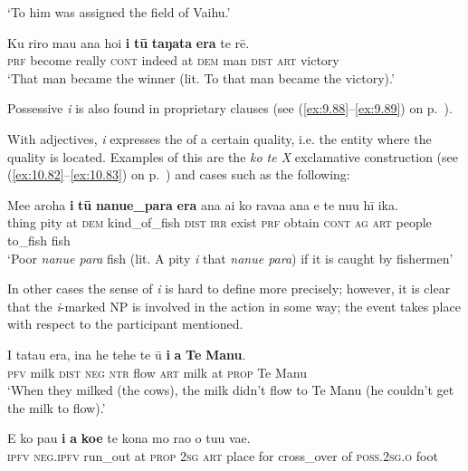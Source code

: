 \glt 
‘To him was assigned the field of Vaihu.’ \textstyleExampleref{[R250.052]} 
\z

\ea\label{ex:4.257}
\gll Ku riro mau {\ꞌ}ana ho{\ꞌ}i \textbf{i} \textbf{tū} \textbf{taŋata} \textbf{era} te rē.\\
\textsc{prf} become really \textsc{cont} indeed at \textsc{dem} man \textsc{dist} \textsc{art} victory\\

\glt
‘That man became the winner (lit. To that man became the victory).’ \textstyleExampleref{[R372.154]} 
\z

Possessive \textit{i} is also found in proprietary clauses (see (\ref{ex:9.88}–\ref{ex:9.89}) on p.~\pageref{ex:9.88}).

With adjectives, \textit{i} expresses the  of a certain quality, i.e. the entity where the quality is located. Examples of this are the \textit{ko te X} exclamative construction (see (\ref{ex:10.82}–\ref{ex:10.83}) on p.~\pageref{ex:10.82}) and cases such as the following:

\ea\label{ex:4.258}
\gll Me{\ꞌ}e {\ꞌ}aroha \textbf{i} \textbf{tū} \textbf{nanue\_para} \textbf{era} ana ai ko rava{\ꞌ}a {\ꞌ}ana e te nu{\ꞌ}u  hī ika.\\
thing pity at \textsc{dem} kind\_of\_fish \textsc{dist} \textsc{irr} exist \textsc{prf} obtain \textsc{cont} \textsc{ag} \textsc{art} people  to\_fish fish\\

\glt
‘Poor \textit{nanue para} fish (lit. A pity \textit{i} that \textit{nanue para}) if it is caught by fishermen’ \textstyleExampleref{[R301.320]} 
\z

In other cases the sense of \textit{i} is hard to define more precisely; however, it is clear that the \textit{i}{}-marked NP is involved in the action in some way; the event takes place with respect to the participant mentioned.

\ea\label{ex:4.259}
\gll I tatau era, {\ꞌ}ina he tehe te ū \textbf{i} \textbf{a} \textbf{Te} \textbf{Manu}.\\
\textsc{pfv} milk \textsc{dist} \textsc{neg} \textsc{ntr} flow \textsc{art} milk at \textsc{prop} Te Manu\\

\glt 
‘When they milked (the cows), the milk didn’t flow to Te Manu (he couldn’t get the milk to flow).’ \textstyleExampleref{[R245.192]} 
\z

\ea\label{ex:4.260}
\gll E ko pau \textbf{i} \textbf{a} \textbf{koe} te kona mo rao o tu{\ꞌ}u va{\ꞌ}e. \\
\textsc{ipfv} \textsc{neg.ipfv} run\_out at \textsc{prop} \textsc{2sg} \textsc{art} place for cross\_over of \textsc{poss.2sg.o} foot \\

